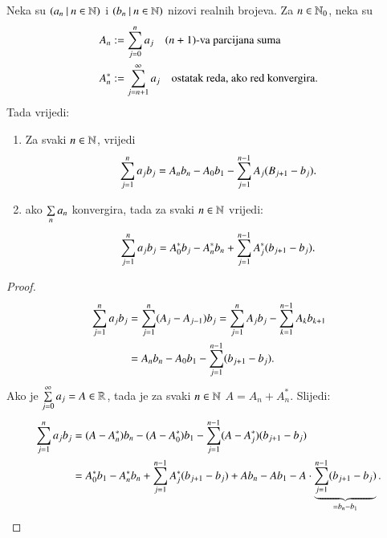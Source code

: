 \begin{lm}    \label{lm:13.10}
    Neka su $({a_n} \: | \: {n \in \mathbb{N}})$ i $({b_n} \: | \: {n \in \mathbb{N}})$ nizovi realnih brojeva.
    Za $n \in \mathbb{N}_0$, neka su
    \begin{equation*}
        \begin{aligned}
            A_n &:= \sum\limits_{j = 0}^{n} a_j \quad (n + 1) \textnormal{-va parcijana suma}\\
            A_n^* &:= \sum\limits_{j = n + 1}^{\infty} a_j \quad \textnormal{ostatak reda, ako red konvergira}.
        \end{aligned}
    \end{equation*}
    Tada vrijedi:
    \begin{enumerate}[label=(\roman*)]
        \item Za svaki $n \in \mathbb{N}$, vrijedi
        \begin{equation*}
            \sum\limits_{j = 1}^{n} a_j b_j = A_n b_n - A_0 b_1 - \sum\limits_{j = 1}^{n - 1} A_j (B_{j + 1} - b_j).
        \end{equation*}
        \item ako $\sum\limits_{n}^{} a_n$ konvergira, tada za svaki $n \in \mathbb{N}$ vrijedi:
        \begin{equation*}
            \sum\limits_{j = 1}^{n} a_j b_j = A_0^* b_j - A_n^* b_n + \sum\limits_{j = 1}^{n - 1} A_j^* (b_{j + 1} - b_j). 
        \end{equation*}
    \end{enumerate}
\end{lm}

\begin{proof}
    \begin{equation*}
        \begin{aligned}
            \sum\limits_{j = 1}^{n} a_j b_j &= \sum\limits_{j = 1}^{n} (A_j - A_{j - 1}) b_j = \sum\limits_{j = 1}^{n} A_j b_j - \sum\limits_{k = 1}^{n - 1} A_k b_{k + 1}\\
            &= A_n b_n - A_0 b_1 - \sum\limits_{j = 1}^{n - 1} (b_{j + 1} - b_j).
        \end{aligned}
    \end{equation*}
    Ako je $\sum\limits_{j = 0}^{\infty} a_j = A \in \mathbb{R}$, tada je za svaki $n \in \mathbb{N}$ $A = A_n + A_n^*$. Slijedi:
    \begin{equation*}
        \begin{aligned}
            \sum\limits_{j = 1}^{n} a_j b_j &= (A - A_n^*)b_n - (A - A_0^*) b_1 - \sum\limits_{j = 1}^{n - 1} (A - A_j^*) (b_{j + 1} - b_j)\\
            &= A_0^* b_1 - A_n^* b_n + \sum\limits_{j = 1}^{n - 1} A_j^* (b_{j + 1} - b_j) + A b_n - A b_1 - A \cdot \underbrace{\sum\limits_{j = 1}^{n - 1} (b_{j + 1} - b_j)}_{= b_n - b_1}.
        \end{aligned}
    \end{equation*}
\end{proof}

